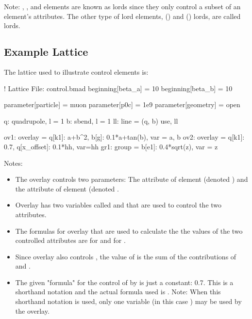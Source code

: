 \documentclass{hitec}
\begin{document}
Note: , , and  elements are known as  lords since they
only control a subset of an element's attributes. The other type of lord elements, 
() and  () lords, are called  lords.

\newpage

\subsection{Example Lattice}

The lattice used to illustrate control elements is:
\begin{code}
! Lattice File: control.bmad
beginning[beta_a] = 10
beginning[beta_b] = 10

parameter[particle] = muon
parameter[p0c] = 1e9
parameter[geometry] = open

q: quadrupole, l = 1
b: sbend, l = 1
ll: line = (q, b)
use, ll

ov1: overlay = {q[k1]: a+b^2, b[g]: 0.1*a+tan(b)}, var = {a, b}
ov2: overlay = {q[k1]: 0.7, q[x_offset]: 0.1*hh}, var={hh}
gr1: group = {b[e1]: 0.4*sqrt(z)}, var = {z}
\end{code}

Notes:
\begin{itemize}
\item
The overlay  controls two parameters: 
The  attribute of element  (denoted ) and the  attribute of element
 (denoted .
\item
Overlay  has two variables called  and  that are used to control the two attributes.
\item
The formulas for overlay  that are used to calculate the the values of the two controlled
attributes are  for  and  for .
\item 
Since overlay  also controls , the value of  is the sum of the
contributions of  and .
\item
The given "formula" for the control of  by  is just a constant: 0.7. 
This is a shorthand notation and the actual formula used is . 
Note: When this shorthand notation is used, only one variable (in this case ) may be used by the overlay.
\end{itemize}
\end{document}
